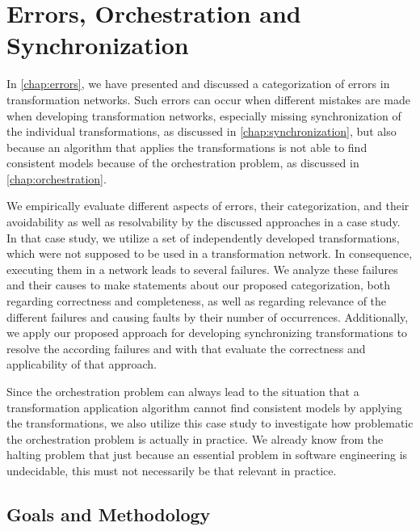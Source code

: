 \section{Errors, Orchestration and Synchronization}

In \autoref{chap:errors}, we have presented and discussed a categorization of errors in transformation networks.
Such errors can occur when different mistakes are made when developing transformation networks, especially missing synchronization of the individual transformations, as discussed in \autoref{chap:synchronization}, but also because an algorithm that applies the transformations is not able to find consistent models because of the orchestration problem, as discussed in \autoref{chap:orchestration}.

We empirically evaluate different aspects of errors, their categorization, and their avoidability as well as resolvability by the discussed approaches in a case study.
In that case study, we utilize a set of independently developed transformations, which were not supposed to be used in a transformation network.
In consequence, executing them in a network leads to several failures.
We analyze these failures and their causes to make statements about our proposed categorization, both regarding correctness and completeness, as well as regarding relevance of the different failures and causing faults by their number of occurrences.
Additionally, we apply our proposed approach for developing synchronizing transformations to resolve the according failures and with that evaluate the correctness and applicability of that approach.

Since the orchestration problem can always lead to the situation that a transformation application algorithm cannot find consistent models by applying the transformations, we also utilize this case study to investigate how problematic the orchestration problem is actually in practice.
We already know from the halting problem that just because an essential problem in software engineering is undecidable, this must not necessarily be that relevant in practice.


\subsection{Goals and Methodology}

